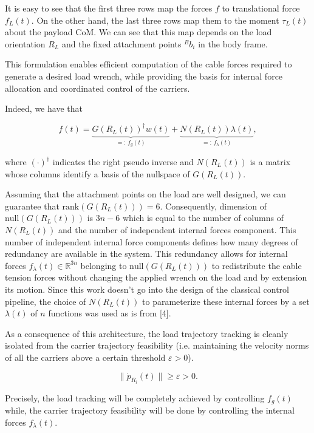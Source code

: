 It is easy to see that the first three rows map the forces $f$ to
translational force $f_L(t)$. On the other hand, the last three rows map
them to the moment $\tau_L(t)$ about the payload CoM. We can see that
this map depends on the load orientation $R_L$ and the fixed attachment
points ${}^{B}b_i$ in the body frame.

This formulation enables efficient computation of the cable forces
required to generate a desired load wrench, while providing the basis for
internal force allocation and coordinated control of the carriers.

Indeed, we have that

\begin{equation}
  f(t) = \underbrace{G(R_L(t))^\dagger w(t)}_{=:\, f_g(t)} + \underbrace{N(R_L(t)) \lambda(t)}_{=:\, f_\lambda(t)},
  \label{eq:force-decomposition}
\end{equation}

where $(\cdot)^\dagger$ indicates the right pseudo inverse and
$N(R_L(t))$ is a matrix whose columns identify a basis of the nullspace
of $G(R_L(t))$.

Assuming that the attachment points on the load are well designed, we can
guarantee that $\mathrm{rank}(G(R_L(t))) = 6$. Consequently, dimension of
$\mathrm{null}(G(R_L(t)))$ is $3n - 6$ which is equal to the number of
columns of $N(R_L(t))$ and the number of independent internal forces
component. This number of independent internal force components defines
how many degrees of redundancy are available in the system. This
redundancy allows for internal forces $f_\lambda(t) \in \mathbb{R}^{3n}$
belonging to $\mathrm{null}(G(R_L(t)))$ to redistribute the cable tension
forces without changing the applied wrench on the load and by extension
its motion. Since this work doesn’t go into the design of the classical
control pipeline, the choice of $N(R_L(t))$ to parameterize these
internal forces by a set $\lambda(t)$ of $n$ functions was used as is
from [4].

As a consequence of this architecture, the load trajectory tracking is
cleanly isolated from the carrier trajectory feasibility (i.e.
maintaining the velocity norms of all the carriers above a certain
threshold $\varepsilon > 0$).

\begin{equation}
  \|\dot{p}_{R_i}(t)\| \geq \varepsilon > 0.
  \label{eq:velocity-floor}
\end{equation}

Precisely, the load tracking will be completely achieved by controlling
$f_g(t)$ while, the carrier trajectory feasibility will be done by
controlling the internal forces $f_\lambda(t)$.


